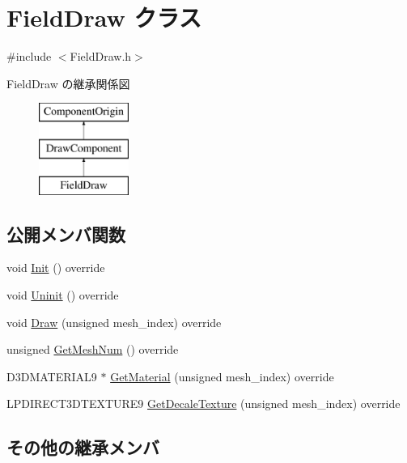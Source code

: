 \hypertarget{class_field_draw}{}\section{Field\+Draw クラス}
\label{class_field_draw}


{\ttfamily \#include $<$Field\+Draw.\+h$>$}

Field\+Draw の継承関係図\begin{figure}[H]
\begin{center}
\leavevmode
\includegraphics[height=3.000000cm]{class_field_draw}
\end{center}
\end{figure}
\subsection*{公開メンバ関数}
\begin{DoxyCompactItemize}
\item 
void \mbox{\hyperlink{class_field_draw_a4287d2ce33033b2413c1d3a81b173373}{Init}} () override
\item 
void \mbox{\hyperlink{class_field_draw_a89a78212c141714d9e39e25e663aaeff}{Uninit}} () override
\item 
void \mbox{\hyperlink{class_field_draw_a78b6bc16f825e91c39fad97931ea63fd}{Draw}} (unsigned mesh\+\_\+index) override
\item 
unsigned \mbox{\hyperlink{class_field_draw_a8637a3a4d08d0ac466a370edac39b584}{Get\+Mesh\+Num}} () override
\item 
D3\+D\+M\+A\+T\+E\+R\+I\+A\+L9 $\ast$ \mbox{\hyperlink{class_field_draw_ae1c720b24a99003a3c413ce0f6dadcb0}{Get\+Material}} (unsigned mesh\+\_\+index) override
\item 
L\+P\+D\+I\+R\+E\+C\+T3\+D\+T\+E\+X\+T\+U\+R\+E9 \mbox{\hyperlink{class_field_draw_a06e1621342d80ea696a5fbf54d5d997b}{Get\+Decale\+Texture}} (unsigned mesh\+\_\+index) override
\end{DoxyCompactItemize}
\subsection*{その他の継承メンバ}


